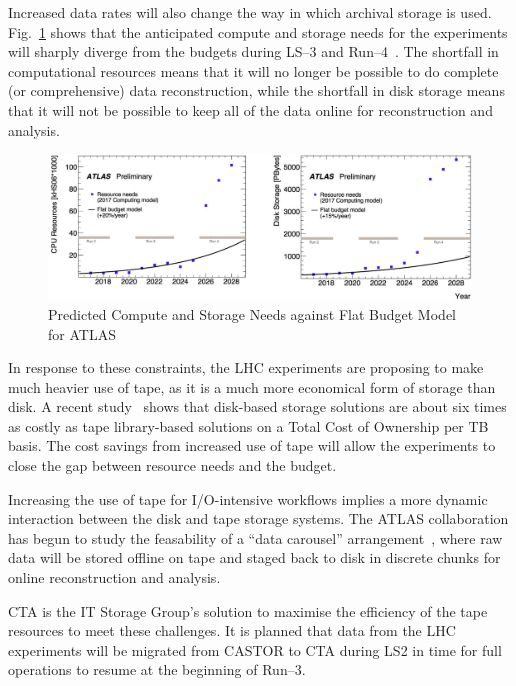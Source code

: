 \documentclass{webofc}
\begin{document}
Increased data rates will also change the way in which archival storage is used. Fig.~\ref{fig:ATLAS_ComputeStorageRequirements}
shows that the anticipated compute and storage needs for the experiments will sharply diverge from the budgets during
LS--3 and Run--4~\cite{atlas_future_chep2018}.
The shortfall in computational resources means that it will no longer be possible to do complete (or comprehensive) data reconstruction,
while the shortfall in disk storage means that it will not be possible to keep all of the data online for
reconstruction and analysis.

\begin{figure}[t]
   \centering
   \includegraphics[width=\textwidth]{images/ATLAS_ComputeStorageRequirements.png}%
   \caption{Predicted Compute and Storage Needs against Flat Budget Model for ATLAS}
   \label{fig:ATLAS_ComputeStorageRequirements}
\end{figure}

In response to these constraints, the LHC experiments are proposing to make much heavier use of tape, as it is a much
more economical form of storage than disk. A recent study~\cite{clipper_tco_2015} shows that disk-based storage
solutions are about six times as costly as tape library-based solutions on a Total Cost of Ownership per TB basis. The
cost savings from increased use of tape will allow the experiments to close the gap between resource needs and the budget.

Increasing the use of tape for I/O-intensive workflows implies a more dynamic interaction between the disk and
tape storage systems. The ATLAS collaboration has begun to study the feasability of a ``data carousel'' arrangement~\cite{xin_zhao_tape_usage},
where raw data will be stored offline on tape and staged back to disk in discrete chunks for online reconstruction
and analysis.

CTA is the IT Storage Group's solution to maximise the efficiency of the tape resources to meet these challenges.
It is planned that data from the LHC experiments will be migrated from CASTOR to
CTA during LS2 in time for full operations to resume at the beginning of Run--3.
\end{document}
